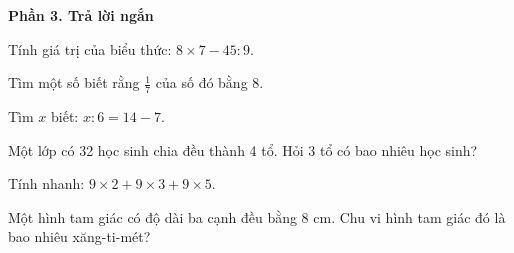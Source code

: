 \textbf{Phần 3. Trả lời ngắn}

\begin{ex} %
Tính giá trị của biểu thức: $8 \times 7 - 45 : 9$.
\end{ex}

\begin{ex} %
Tìm một số biết rằng $\frac{1}{7}$ của số đó bằng 8.
\end{ex}

\begin{ex} %
Tìm $x$ biết: $x : 6 = 14 - 7$.
\end{ex}

\begin{ex} %
Một lớp có 32 học sinh chia đều thành 4 tổ. Hỏi 3 tổ có bao nhiêu học sinh?
\end{ex}

\begin{ex} %
Tính nhanh: $9 \times 2 + 9 \times 3 + 9 \times 5$.
\end{ex}

\begin{ex} %
Một hình tam giác có độ dài ba cạnh đều bằng 8 cm. Chu vi hình tam giác đó là bao nhiêu xăng-ti-mét?
\end{ex}

